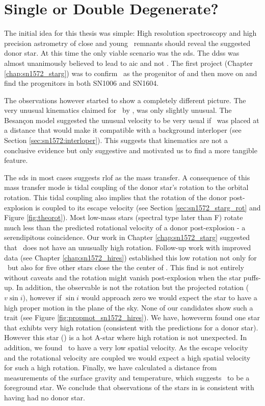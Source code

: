 \section{Single or Double Degenerate?}

The initial idea for this thesis was simple: High resolution spectroscopy and high precision astrometry of close and young \snia\ remnants should reveal the suggested donor star. At this time the only viable scenario was the \gls{sds}. The \glspl{dds} was almost unanimously believed to lead to \gls{aic} and not \sneia. The first project (Chapter \vref{chap:sn1572_starg}) was to confirm \starg\ as the progenitor of  and then move on and find the progenitors in both SN1006 and SN1604. 

The observations however started to show a completely different picture. The very unusual kinematics claimed for \starg\  by \citet{2004Natur.431.1069R}, was only slightly unusual. The Besan\c{c}on model suggested the unusual velocity to be very usual if \starg\ was placed at a distance that would make it compatible with a background interloper (see Section \vref{sec:sn1572:interloper}). This suggests that kinematics are not a conclusive evidence but only suggestive and motivated us to find a more tangible feature. 

The \gls{sds} in most cases suggests \gls{rlof} as the mass transfer. A consequence of this mass transfer mode is tidal coupling of the donor star's rotation to the orbital rotation. This tidal coupling also implies that the rotation of the donor post-explosion is coupled to its escape velocity (see Section \vref{sec:sn1572_starg_rot} and Figure \vref{fig:theorot}). Most low-mass stars (spectral type later than F) rotate much less than the predicted rotational velocity of a donor post-explosion - a serendipitous coincidence. Our work in Chapter \vref{chap:sn1572_starg} suggested that \starg\ does not have an unusually high rotation. Follow-up work with improved data (see Chapter \ref{chap:sn1572_hires}) established this low rotation not only for \starg\ but also for five other stars close the the center of . This find is not entirely without caveats and the rotation might vanish post-explosion when the star puffs-up. In addition, the observable is not the rotation but the projected rotation ($v\sin{i}$), however if $\sin{i}$ would approach zero we would expect the star to have a high proper motion in the plane of the sky. None of our candidates show such a trait (see Figure \vref{fig:propmot_sn1572_hires}). 
We have, howeverm found one star that exhibts very high rotation (consistent with the predictions for a donor star). However this star (\starb) is a hot A-star where high rotation is not unexpected. In addition, we found \starb\ to have a very low spatial velocity. As the escape velocity and the rotational velocity are coupled we would expect a high spatial velocity for such a high rotation. Finally, we have calculated a distance from measurements of the surface gravity and temperature, which suggests \starb\ to be a foreground star. We conclude that observations of the stars in  is consistent with  having had no \gls{donor} star. 

